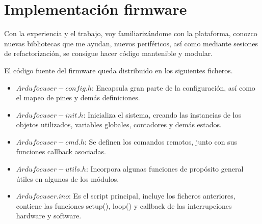 \newpage

\section{Implementación firmware}


Con la experiencia y el trabajo, voy familiarizándome con la plataforma, conozco nuevas bibliotecas que me ayudan, nuevos periféricos,  así como mediante sesiones de refactorización, se consigue hacer código mantenible y modular. 

El código fuente del firmware queda distribuido en los siguientes ficheros.

\begin{itemize}
	
\item $Ardufocuser-config.h$: Encapsula gran parte de la configuración, así como el mapeo de pines y demás definiciones. 
\item $Ardufocuser-init.h$: Inicializa el sistema, creando las instancias de los objetos utilizados, variables globales, contadores y demás estados.
\item $Ardufocuser-cmd.h$: Se definen los comandos remotos, junto con sus funciones callback asociadas.
\item $Ardufocuser-utils.h$: Incorpora algunas funciones de propósito general útiles en algunos de los módulos. 
\item $Ardufocuser.ino$: Es el script principal, incluye los ficheros anteriores, contiene las funciones setup(),  loop() y callback de las interrupciones hardware y software.

\end{itemize}
\newpage
